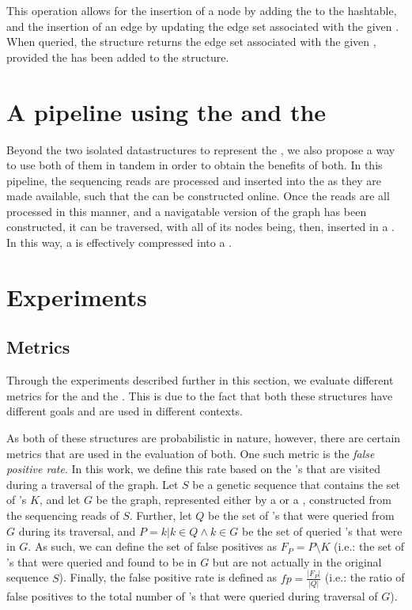 This operation allows for the insertion of a node by adding the \kmer to the hashtable, and the insertion of an edge by updating the
edge set associated with the given \kmer. When queried, the structure returns the edge set associated with the given \kmer, provided
the \kmer has been added to the structure.

\section{A pipeline using the \dBCM and the \dBHT}


Beyond the two isolated datastructures to represent the \dBG, we also propose a way to use both of them in tandem in order to obtain
the benefits of both. In this pipeline, the sequencing reads are processed and inserted into the \dBCM as they are made available,
such that the \dBG can be constructed online. Once the reads are all processed in this manner, and a navigatable version of the graph 
has been constructed, it can be traversed, with all of its nodes being, then, inserted in a \dBHT. In this way, a \dBCM is effectively
compressed into a \dBHT.

\section{Experiments}

\subsection{Metrics}

Through the experiments described further in this section, we evaluate different metrics for the \dBCM and the \dBHT. This is due to
the fact that both these structures have different goals and are used in different contexts.

As both of these structures are probabilistic in nature, however, there are certain metrics that are used in the evaluation of both.
One such metric is the \emph{false positive rate}. In this work, we define this rate based on the \kmer's that are visited during a 
traversal of the graph. Let $S$ be a genetic sequence that contains the set of \kmer's $K$, and let $G$ be the graph, represented
either by a \dBCM or a \dBHT, constructed from the sequencing reads of $S$. Further, let $Q$ be the set of \kmer's that were queried
from $G$ during its traversal, and $P={k | k \in Q \wedge k \in G}$ be the set of queried \kmer's that were in $G$. As such, we can
define the set of false positives as $F_P=P \setminus K$ (i.e.: the set of \kmer's that were queried and found to be in $G$ but are not
actually in the original sequence $S$). Finally, the false positive rate is defined as $fp=\frac{|F_P|}{|Q|}$ (i.e.: the ratio of false
positives to the total number of \kmer's that were queried during traversal of $G$).

